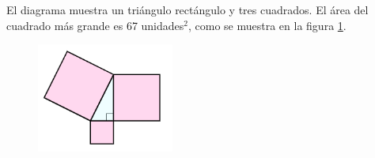 \question[15]  El diagrama muestra un triángulo rectángulo y tres cuadrados.
El área del cuadrado más grande es 67 unidades$^2$, como se muestra en la figura \ref{fig:area12}.
\begin{figure}[H]
    \begin{center}
        \includegraphics[width=0.4\textwidth]{../images/area12.png}
    \end{center}
    \caption{}
    \label{fig:area12}
\end{figure}

